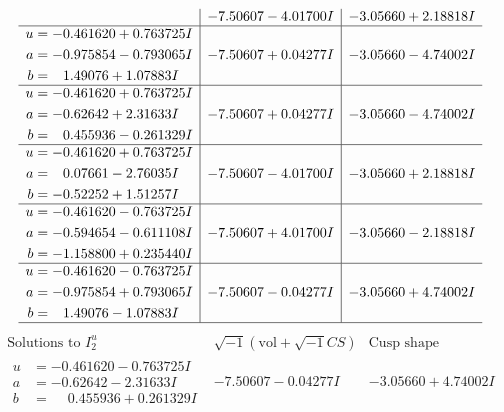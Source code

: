\documentclass[1p]{elsarticle_modified}
\theoremstyle{definition}
\newcommand{\I}{\sqrt{-1}}
\begin{document}
$$\begin{array}{c|c|c}
 & -7.50607 - 4.01700 I & -3.05660 + 2.18818 I \\ \hline\begin{aligned}
u &= -0.461620 + 0.763725 I \\
a &= -0.975854 - 0.793065 I \\
b &= \phantom{-}1.49076 + 1.07883 I\end{aligned}
 & -7.50607 + 0.04277 I & -3.05660 - 4.74002 I \\ \hline\begin{aligned}
u &= -0.461620 + 0.763725 I \\
a &= -0.62642 + 2.31633 I \\
b &= \phantom{-}0.455936 - 0.261329 I\end{aligned}
 & -7.50607 + 0.04277 I & -3.05660 - 4.74002 I \\ \hline\begin{aligned}
u &= -0.461620 + 0.763725 I \\
a &= \phantom{-}0.07661 - 2.76035 I \\
b &= -0.52252 + 1.51257 I\end{aligned}
 & -7.50607 - 4.01700 I & -3.05660 + 2.18818 I \\ \hline\begin{aligned}
u &= -0.461620 - 0.763725 I \\
a &= -0.594654 - 0.611108 I \\
b &= -1.158800 + 0.235440 I\end{aligned}
 & -7.50607 + 4.01700 I & -3.05660 - 2.18818 I \\ \hline\begin{aligned}
u &= -0.461620 - 0.763725 I \\
a &= -0.975854 + 0.793065 I \\
b &= \phantom{-}1.49076 - 1.07883 I\end{aligned}
 & -7.50607 - 0.04277 I & -3.05660 + 4.74002 I\\
 \hline 
 \end{array}$$\newpage$$\begin{array}{c|c|c}  
\text{Solutions to }I^u_{2}& \I (\text{vol} + \sqrt{-1}CS) & \text{Cusp shape}\\
 \hline 
\begin{aligned}
u &= -0.461620 - 0.763725 I \\
a &= -0.62642 - 2.31633 I \\
b &= \phantom{-}0.455936 + 0.261329 I\end{aligned}
 & -7.50607 - 0.04277 I & -3.05660 + 4.74002 I \\ \hline\begin{aligned}

\end{aligned}
\end{array}$$
\end{document}
